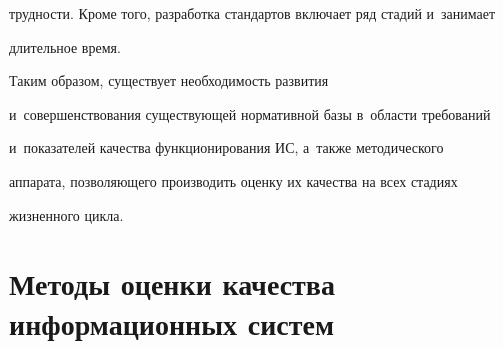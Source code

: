 трудности. Кроме того, разработка стандартов включает ряд стадий и~занимает 

длительное время.

 

     

     Таким образом, существует необходимость развития 

и~совершенствования существующей нормативной базы в~об\-ласти требований

 и~показателей качества функционирования ИС, а~также методического 

аппарата, поз\-во\-ля\-юще\-го производить оценку их качества на всех стадиях 

жиз\-нен\-но\-го цикла.



\section{Методы оценки качества информационных систем}



\vspace*{-4pt}



